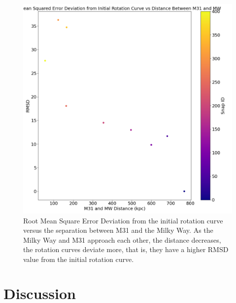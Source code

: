 \documentclass[twocolumn,linenumbers,trackchanges]{aastex7}
\begin{document}
\begin{figure}
    \centering
    \includegraphics[width=1.0\linewidth]{RMSD_M31.png}
    \caption{Root Mean Square Error Deviation from the initial rotation curve versus the separation between M31 and the Milky Way. As the Milky Way and M31 approach each other, the distance decreases, the rotation curves deviate more, that is, they have a higher RMSD value from the initial rotation curve.}
    \label{fig:enter-label}
\end{figure}


\section{Discussion}

\end{document}

